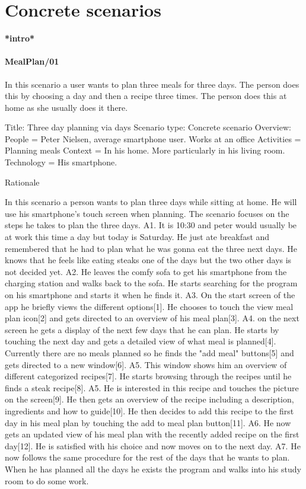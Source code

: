 \section{Concrete scenarios}
\textbf{*intro*}

\paragraph{MealPlan/01}
In this scenario a user wants to plan three meals for three days. The person does this by choosing a day and then a recipe three times. The person does this at home as she usually does it there.

Title: Three day planning via days
Scenario type: Concrete scenario
Overview: 
	People = Peter Nielsen, average smartphone user. Works at an office
	Activities = Planning meals
	Context = In his home. More particularly in his living room.
	Technology = His smartphone.
	
Rationale

In this scenario a person wants to plan three days while sitting at home. He will use his smartphone's touch screen when planning. The scenario focuses on the steps he takes to plan the three days.
	A1. It is 10:30 and peter would usually be at work this time a day but today is Saturday. He just ate breakfast and remembered that he had to plan what he was gonna eat the three next days. He knows that he feels like eating steaks one of the days but the two other days is not decided yet.
	A2. He leaves the comfy sofa to get his smartphone from the charging station and walks back to the sofa. He starts searching for the program on his smartphone and starts it when he finds it.
	A3. On the start screen of the app he briefly views the different options[1]. He chooses to touch the view meal plan icon[2] and gets directed to an overview of his meal plan[3]. 
	A4. on the next screen he gets a display of the next few days that he can plan. He starts by touching the next day and gets a detailed view of what meal is planned[4]. Currently there are no meals planned so he finds the "add meal" buttons[5] and gets directed to a new window[6]. 
	A5. This window shows him an overview of different categorized recipes[7]. He starts browsing through the recipes until he finds a steak recipe[8]. 
	A5. He is interested in this recipe and touches the picture on the screen[9]. He then gets an overview of the recipe including a description, ingredients and how to guide[10]. He then decides to add this recipe to the first day in his meal plan by touching the add to meal plan button[11].
	A6. He now gets an updated view of his meal plan with the recently added recipe on the first day[12]. He is satisfied with his choice and now moves on to the next day. 
	A7. He now follows the same procedure for the rest of the days that he wants to plan. When he has planned all the days he exists the program and walks into his study room to do some work.
	

